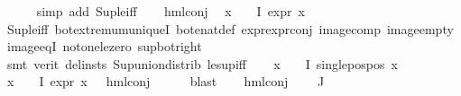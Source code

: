 \begin{isabellebody}
\ \ \ \ \isamarkupfalse%
\ {\isacharparenleft}{\kern0pt}simp\ add{\isacharcolon}{\kern0pt}\ Sup{\isacharunderscore}{\kern0pt}le{\isacharunderscore}{\kern0pt}iff{\isacharparenright}{\kern0pt}\isanewline
\ \ \isamarkupfalse%
\ hml{\isacharunderscore}{\kern0pt}conj\ \isamarkupfalse%
\ {\isachardoublequoteopen}{\isasymforall}x\ {\isasymin}\ {\isasymPhi}\ {\isacharbackquote}{\kern0pt}\ I{\isachardot}{\kern0pt}\ expr{\isacharunderscore}{\kern0pt}{}\ x\ {\isasymle}\ {}{\isachardoublequoteclose}\isanewline
\ \ \ \ \isamarkupfalse%
\ Sup{\isacharunderscore}{\kern0pt}le{\isacharunderscore}{\kern0pt}iff\ bot{\isachardot}{\kern0pt}extremum{\isacharunderscore}{\kern0pt}uniqueI\ bot{\isacharunderscore}{\kern0pt}enat{\isacharunderscore}{\kern0pt}def\ expr{\isacharunderscore}{\kern0pt}{}{\isachardot}{\kern0pt}expr{\isacharunderscore}{\kern0pt}{}{\isacharunderscore}{\kern0pt}conj\ image{\isacharunderscore}{\kern0pt}comp\ image{\isacharunderscore}{\kern0pt}empty\ image{\isacharunderscore}{\kern0pt}eqI\ not{\isacharunderscore}{\kern0pt}one{\isacharunderscore}{\kern0pt}le{\isacharunderscore}{\kern0pt}zero\ sup{\isacharunderscore}{\kern0pt}bot{\isacharunderscore}{\kern0pt}right\isanewline
\ \ \ \ \isamarkupfalse%
\ {\isacharparenleft}{\kern0pt}smt\ {\isacharparenleft}{\kern0pt}verit{\isacharcomma}{\kern0pt}\ del{\isacharunderscore}{\kern0pt}insts{\isacharparenright}{\kern0pt}\ Sup{\isacharunderscore}{\kern0pt}union{\isacharunderscore}{\kern0pt}distrib\ le{\isacharunderscore}{\kern0pt}sup{\isacharunderscore}{\kern0pt}iff{\isacharparenright}{\kern0pt}\isanewline
\ \ \isamarkupfalse%
\ {\isachardoublequoteopen}{\isasymforall}x\ {\isasymin}\ {\isasymPhi}\ {\isacharbackquote}{\kern0pt}\ I{\isachardot}{\kern0pt}\ single{\isacharunderscore}{\kern0pt}pos{\isacharunderscore}{\kern0pt}pos\ x{\isachardoublequoteclose}\isanewline
\ \ \ \ \isamarkupfalse%
\ {\isacartoucheopen}{\isasymforall}x\ {\isasymin}\ {\isasymPhi}\ {\isacharbackquote}{\kern0pt}\ I{\isachardot}{\kern0pt}\ expr{\isacharunderscore}{\kern0pt}{}\ x\ {\isasymle}\ {}{\isacartoucheclose}\ hml{\isacharunderscore}{\kern0pt}conj\isanewline
\ \ \ \ \isamarkupfalse%
\ blast\isanewline
\ \ \isamarkupfalse%
\ hml{\isacharunderscore}{\kern0pt}conj\ \isamarkupfalse%
\ {\isachardoublequoteopen}{\isasymPhi}\ {\isacharbackquote}{\kern0pt}\ J\ {\isacharequal}{\kern0pt}\ {\isacharbraceleft}{\kern0pt}{\isacharbraceright}{\kern0pt}{\isachardoublequoteclose}\isanewline

\end{isabellebody}
